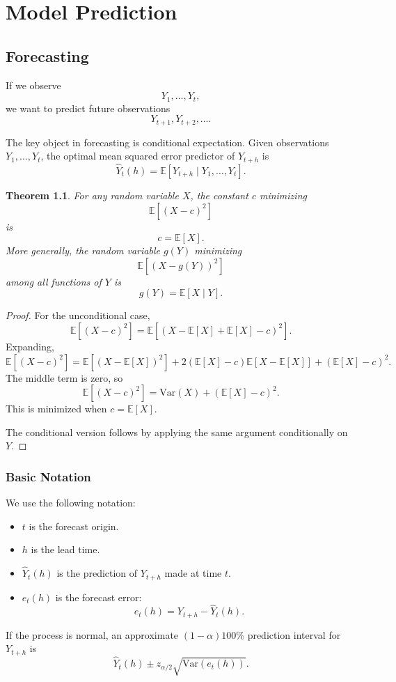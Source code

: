 \documentclass[12pt,oneside]{book}
\numberwithin{equation}{section}
\theoremstyle{definition}
\theoremstyle{plain}
\newtheorem{theorem}{Theorem}[section]
\theoremstyle{remark}
\newcommand{\E}{\mathbb{E}}
\newcommand{\Var}{\mathrm{Var}}
\begin{document}
\chapter{Model Prediction}
\section{Forecasting}

If we observe
\[
Y_1,\ldots,Y_t,
\]
we want to predict future observations
\[
Y_{t+1},Y_{t+2},\ldots.
\]

The key object in forecasting is conditional expectation. Given observations $Y_1,\ldots,Y_t$, the optimal mean squared error predictor of $Y_{t+h}$ is
\[
\widehat{Y}_t(h)
=
\E[Y_{t+h}\mid Y_1,\ldots,Y_t].
\]

\begin{theorem}
For any random variable $X$, the constant $c$ minimizing
\[
\E[(X-c)^2]
\]
is
\[
c=\E[X].
\]
More generally, the random variable $g(Y)$ minimizing
\[
\E[(X-g(Y))^2]
\]
among all functions of $Y$ is
\[
g(Y)=\E[X\mid Y].
\]
\end{theorem}

\begin{proof}
For the unconditional case,
\[
\E[(X-c)^2]
=
\E[(X-\E[X]+\E[X]-c)^2].
\]
Expanding,
\[
\E[(X-c)^2]
=
\E[(X-\E[X])^2]
+
2(\E[X]-c)\E[X-\E[X]]
+
(\E[X]-c)^2.
\]
The middle term is zero, so
\[
\E[(X-c)^2]
=
\Var(X)+(\E[X]-c)^2.
\]
This is minimized when $c=\E[X]$.

The conditional version follows by applying the same argument conditionally on $Y$.
\end{proof}

\subsection{Basic Notation}

We use the following notation:

\begin{itemize}
\item $t$ is the forecast origin.
\item $h$ is the lead time.
\item $\widehat{Y}_t(h)$ is the prediction of $Y_{t+h}$ made at time $t$.
\item $e_t(h)$ is the forecast error:
\[
e_t(h)=Y_{t+h}-\widehat{Y}_t(h).
\]
\end{itemize}

If the process is normal, an approximate $(1-\alpha)100\%$ prediction interval for $Y_{t+h}$ is
\[
\widehat{Y}_t(h)
\pm
z_{\alpha/2}\sqrt{\Var(e_t(h))}.
\]
\end{document}

